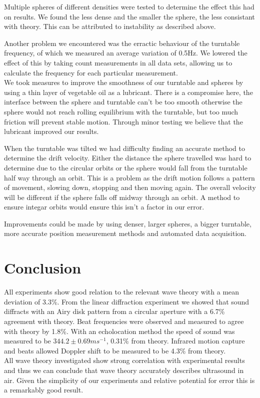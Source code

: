 \documentclass[a4paper,10pt,journal]{IEEEtran}
\begin{document}
Multiple spheres of different densities were tested to determine the effect this had on results. We found the less dense and the smaller the sphere, the less consistant with theory. This can be attributed to instability as described above.

Another problem we encountered was the erractic behaviour of the turntable frequency, of which we measured an average variation of 0.5Hz. We lowered the effect of this by taking count measurements in all data sets, allowing us to calculate the frequency for each particular measurement.\\
We took measures to improve the smoothness of our turntable and spheres by using a thin layer of vegetable oil as a lubricant. There is a compromise here, the interface between the sphere and turntable can't be too smooth otherwise the sphere would not reach rolling equilibrium with the turntable, but too much friction will prevent stable motion. Through minor testing we believe that the lubricant improved our results.

When the turntable was tilted we had difficulty finding an accurate method to determine the drift velocity. Either the distance the sphere travelled was hard to determine due to the circular orbits or the sphere would fall from the turntable half way through an orbit. This is a problem as the drift motion follows a pattern of movement, slowing down, stopping and then moving again. The overall velocity will be different if the sphere falls off midway through an orbit. A method to ensure integar orbits would ensure this isn't a factor in our error.

Improvements could be made by using denser, larger spheres, a bigger turntable, more accurate position measurement methods and automated data acquisition.

\section{Conclusion}

All experiments show good relation to the relevant wave theory with a mean deviation of 3.3\%. From the linear diffraction experiment we showed that sound diffracts with an Airy disk pattern from a circular aperture with a 6.7\% agreement with theory. Beat frequencies were observed and measured to agree with theory by 1.8\%. With an echolocation method the speed of sound was measured to be $344.2 \pm 0.69 ms^{-1}$, 0.31\% from theory. Infrared motion capture and beats allowed Doppler shift to be measured to be 4.3\% from theory.\\
All wave theory investigated show strong correlation with experimental results and thus we can conclude that wave theory accurately describes ultrasound in air. Given the simplicity of our experiments and relative potential for error this is a remarkably good result.
\end{document}
